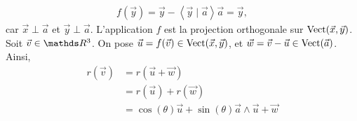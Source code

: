 \documentclass[a4paper]{article}
\begin{document}
\begin{enumerate}
\begin{gather*}
				f(\vec{y}) = \vec{y} - \left<\vec{y} \mid \vec{a} \right>\vec{a} = \vec{y},
			\end{gather*}
			car $\vec{x} \perp \vec{a}$ et $\vec{y} \perp \vec{a}$. L'application $f$ est la projection orthogonale sur $\operatorname{Vect}(\vec{x}, \vec{y})$.
			Soit $\vec{v} \in \R^3$. On pose $\vec{u} = f(\vec{v}) \in \operatorname{Vect}(\vec{x},\vec{y})$, et $\vec{w} = \vec{v} - \vec{u} \in \operatorname{Vect}(\vec{a})$.
			Ainsi,
			\begin{align*}
				r(\vec{v}) &= r(\vec{u} + \vec{w})\\
				&= r(\vec{u}) + r(\vec{w})\\
				&= \cos(\theta)\vec{u} + \sin(\theta)\vec{a} \land \vec{u} + \vec{w} \\
			\end{align*}
	\end{enumerate}
\end{document}
